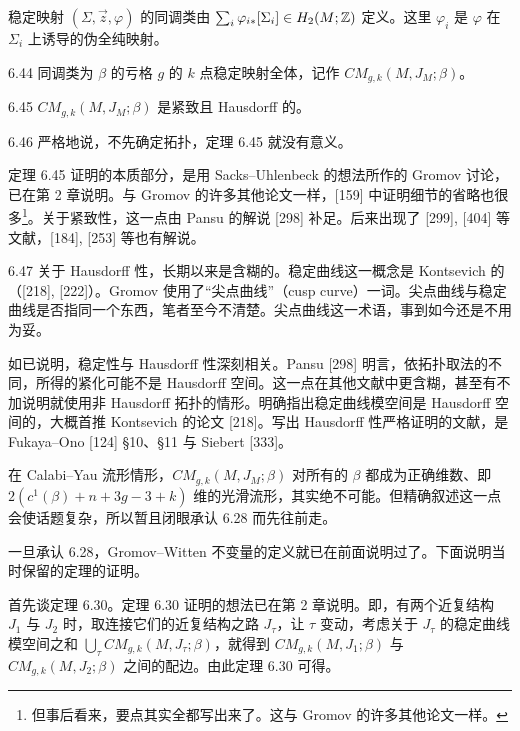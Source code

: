 稳定映射 $(\Sigma,\vec z,\varphi)$ 的同调类由 $\sum_i\varphi_{i*}[\Sigma_i]\in H_2(M;\mathbb{Z})$ 定义。这里 $\varphi_i$ 是 $\varphi$ 在 $\Sigma_i$ 上诱导的伪全纯映射。

\begin{definition}{6.44}
  同调类为 $\beta$ 的亏格 $g$ 的 $k$ 点稳定映射全体，记作 $CM_{g,k}(M,J_M;\beta)$。
\end{definition}

\begin{theorem}{6.45}
  $CM_{g,k}(M,J_M;\beta)$ 是紧致且 Hausdorff 的。
\end{theorem}

\begin{remark}{6.46}
  严格地说，不先确定拓扑，定理 6.45 就没有意义。
\end{remark}

定理 6.45 证明的本质部分，是用 Sacks–Uhlenbeck 的想法所作的 Gromov 讨论，已在第 2 章说明。与 Gromov 的许多其他论文一样，[159] 中证明细节的省略也很多\footnote{但事后看来，要点其实全都写出来了。这与 Gromov 的许多其他论文一样。}。关于紧致性，这一点由 Pansu 的解说 [298] 补足。后来出现了 [299], [404] 等文献，[184], [253] 等也有解说。

\begin{remark}{6.47}
  关于 Hausdorff 性，长期以来是含糊的。稳定曲线这一概念是 Kontsevich 的（[218], [222]）。Gromov 使用了“尖点曲线”（cusp curve）一词。尖点曲线与稳定曲线是否指同一个东西，笔者至今不清楚。尖点曲线这一术语，事到如今还是不用为妥。

  如已说明，稳定性与 Hausdorff 性深刻相关。Pansu [298] 明言，依拓扑取法的不同，所得的紧化可能不是 Hausdorff 空间。这一点在其他文献中更含糊，甚至有不加说明就使用非 Hausdorff 拓扑的情形。明确指出稳定曲线模空间是 Hausdorff 空间的，大概首推 Kontsevich 的论文 [218]。写出 Hausdorff 性严格证明的文献，是 Fukaya–Ono [124] §10、§11 与 Siebert [333]。
\end{remark}


在 Calabi–Yau 流形情形，$CM_{g,k}(M,J_M;\beta)$ 对所有的 $\beta$ 都成为正确维数、即 $2(c^1(\beta)+n+3g-3+k)$ 维的光滑流形，其实绝不可能。但精确叙述这一点会使话题复杂，所以暂且闭眼承认 6.28 而先往前走。

一旦承认 6.28，Gromov–Witten 不变量的定义就已在前面说明过了。下面说明当时保留的定理的证明。

首先谈定理 6.30。定理 6.30 证明的想法已在第 2 章说明。即，有两个近复结构 $J_1$ 与 $J_2$ 时，取连接它们的近复结构之路 $J_\tau$，让 $\tau$ 变动，考虑关于 $J_\tau$ 的稳定曲线模空间之和 $\bigcup_\tau CM_{g,k}(M,J_\tau;\beta)$，就得到 $CM_{g,k}(M,J_1;\beta)$ 与 $CM_{g,k}(M,J_2;\beta)$ 之间的配边。由此定理 6.30 可得。

